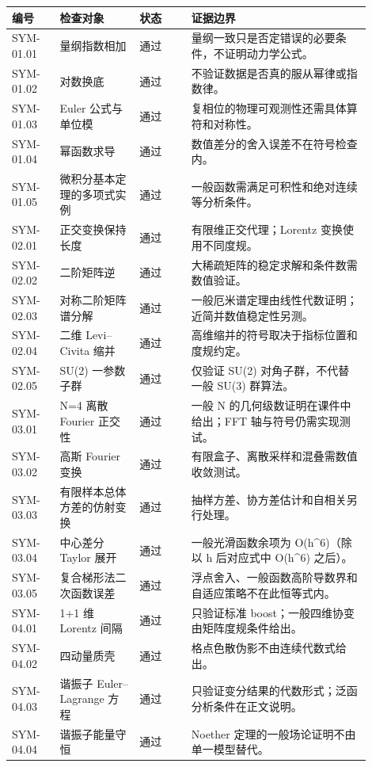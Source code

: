 \begin{longtable}{p{0.12\linewidth}p{0.20\linewidth}p{0.13\linewidth}p{0.45\linewidth}}
\toprule
编号 & 检查对象 & 状态 & 证据边界\\
\midrule
\endhead
SYM-01.01 & 量纲指数相加 & 通过 & 量纲一致只是否定错误的必要条件，不证明动力学公式。\\
SYM-01.02 & 对数换底 & 通过 & 不验证数据是否真的服从幂律或指数律。\\
SYM-01.03 & Euler 公式与单位模 & 通过 & 复相位的物理可观测性还需具体算符和对称性。\\
SYM-01.04 & 幂函数求导 & 通过 & 数值差分的舍入误差不在符号检查内。\\
SYM-01.05 & 微积分基本定理的多项式实例 & 通过 & 一般函数需满足可积性和绝对连续等分析条件。\\
SYM-02.01 & 正交变换保持长度 & 通过 & 有限维正交代理；Lorentz 变换使用不同度规。\\
SYM-02.02 & 二阶矩阵逆 & 通过 & 大稀疏矩阵的稳定求解和条件数需数值验证。\\
SYM-02.03 & 对称二阶矩阵谱分解 & 通过 & 一般厄米谱定理由线性代数证明；近简并数值稳定性另测。\\
SYM-02.04 & 二维 Levi--Civita 缩并 & 通过 & 高维缩并的符号取决于指标位置和度规约定。\\
SYM-02.05 & SU(2) 一参数子群 & 通过 & 仅验证 SU(2) 对角子群，不代替一般 SU(3) 群算法。\\
SYM-03.01 & N=4 离散 Fourier 正交性 & 通过 & 一般 N 的几何级数证明在课件中给出；FFT 轴与符号仍需实现测试。\\
SYM-03.02 & 高斯 Fourier 变换 & 通过 & 有限盒子、离散采样和混叠需数值收敛测试。\\
SYM-03.03 & 有限样本总体方差的仿射变换 & 通过 & 抽样方差、协方差估计和自相关另行处理。\\
SYM-03.04 & 中心差分 Taylor 展开 & 通过 & 一般光滑函数余项为 O(h^6)（除以 h 后对应式中 O(h^6) 之后）。\\
SYM-03.05 & 复合梯形法二次函数误差 & 通过 & 浮点舍入、一般函数高阶导数界和自适应策略不在此恒等式内。\\
SYM-04.01 & 1+1 维 Lorentz 间隔 & 通过 & 只验证标准 boost；一般四维协变由矩阵度规条件给出。\\
SYM-04.02 & 四动量质壳 & 通过 & 格点色散伪影不由连续代数式给出。\\
SYM-04.03 & 谐振子 Euler--Lagrange 方程 & 通过 & 只验证变分结果的代数形式；泛函分析条件在正文说明。\\
SYM-04.04 & 谐振子能量守恒 & 通过 & Noether 定理的一般场论证明不由单一模型替代。\\

\end{longtable}
